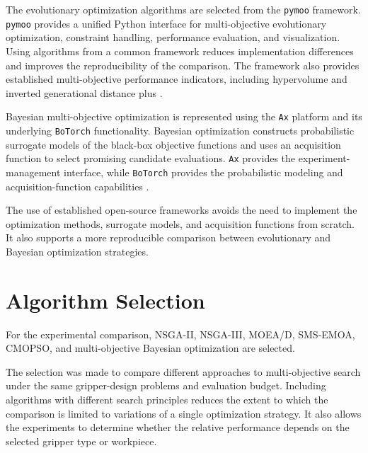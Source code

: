 The evolutionary optimization algorithms are selected from the \texttt{pymoo} framework. \texttt{pymoo} provides a unified Python interface for
multi-objective evolutionary optimization, constraint handling, performance evaluation, and visualization. Using algorithms from a common framework
reduces implementation differences and improves the reproducibility of the comparison. The framework also provides established multi-objective
performance indicators, including hypervolume and inverted generational distance plus \cite{pymoo}.

Bayesian multi-objective optimization is represented using the \texttt{Ax} platform and its underlying \texttt{BoTorch} functionality. Bayesian
optimization constructs probabilistic surrogate models of the black-box objective functions and uses an acquisition function to select promising
candidate evaluations. \texttt{Ax} provides the experiment-management interface, while \texttt{BoTorch} provides the probabilistic modeling and
acquisition-function capabilities \cite{olson2025ax,botorch}.

The use of established open-source frameworks avoids the need to implement the optimization methods, surrogate models, and acquisition functions from
scratch. It also supports a more reproducible comparison between evolutionary and Bayesian optimization strategies.

\section{Algorithm Selection}
\label{sec:methodology_algorithm_selection}

For the experimental comparison, NSGA-II, NSGA-III, MOEA/D, SMS-EMOA, CMOPSO, and multi-objective Bayesian optimization are selected.

The selection was made to compare different approaches to multi-objective search under the same gripper-design problems and evaluation budget.
Including algorithms with different search principles reduces the extent to which the comparison is limited to variations of a single optimization
strategy. It also allows the experiments to determine whether the relative performance depends on the selected gripper type or workpiece.


